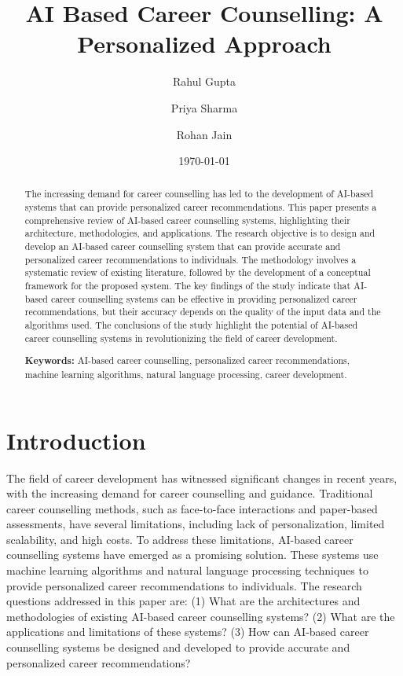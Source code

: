 \documentclass[12pt,a4paper]{article}
\title{AI Based Career Counselling: A Personalized Approach}
\author{Rahul Gupta \and Priya Sharma \and Rohan Jain}
\date{\today}
\begin{document}
\maketitle
\thispagestyle{empty}

\begin{abstract}
The increasing demand for career counselling has led to the development of AI-based systems that can provide personalized career recommendations. This paper presents a comprehensive review of AI-based career counselling systems, highlighting their architecture, methodologies, and applications. The research objective is to design and develop an AI-based career counselling system that can provide accurate and personalized career recommendations to individuals. The methodology involves a systematic review of existing literature, followed by the development of a conceptual framework for the proposed system. The key findings of the study indicate that AI-based career counselling systems can be effective in providing personalized career recommendations, but their accuracy depends on the quality of the input data and the algorithms used. The conclusions of the study highlight the potential of AI-based career counselling systems in revolutionizing the field of career development.

\textbf{Keywords:} AI-based career counselling, personalized career recommendations, machine learning algorithms, natural language processing, career development.
\end{abstract}

\newpage
\tableofcontents
\newpage

\twocolumn
\section{Introduction}
The field of career development has witnessed significant changes in recent years, with the increasing demand for career counselling and guidance. Traditional career counselling methods, such as face-to-face interactions and paper-based assessments, have several limitations, including lack of personalization, limited scalability, and high costs. To address these limitations, AI-based career counselling systems have emerged as a promising solution. These systems use machine learning algorithms and natural language processing techniques to provide personalized career recommendations to individuals. The research questions addressed in this paper are: (1) What are the architectures and methodologies of existing AI-based career counselling systems? (2) What are the applications and limitations of these systems? (3) How can AI-based career counselling systems be designed and developed to provide accurate and personalized career recommendations?
\end{document}
